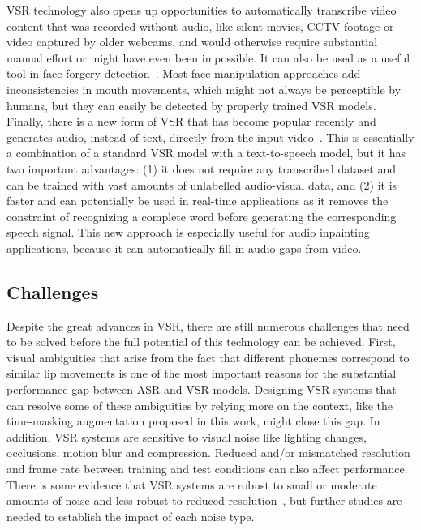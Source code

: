 \documentclass[twocolumn]{article}
\begin{document}
VSR technology also opens up opportunities to automatically transcribe video content that was recorded without audio, like silent movies, CCTV footage or video captured by older webcams, and would otherwise require substantial manual effort or might have even been impossible. It can also be used as a useful tool in face forgery detection~\cite{haliassos2021lips}. Most face-manipulation approaches add inconsistencies in mouth movements, which might not always be perceptible by humans, but they can easily be detected by properly trained VSR models. Finally, there is a new form of VSR that has become popular recently and generates audio, instead of text, directly from the input video~\cite{mira2021end,prajwal2020learning}. This is essentially a combination of a standard VSR model with a text-to-speech model, but it has two important advantages: (1) it does not require any transcribed dataset and can be trained with vast amounts of unlabelled audio-visual data, and (2) it is faster and can potentially be used in real-time applications as it removes the constraint of recognizing a complete word before generating the corresponding speech signal. This new approach is especially useful for audio inpainting applications, because it can automatically fill in audio gaps from video.

\subsection{Challenges}
Despite the great advances in VSR, there are still numerous challenges that need to be solved before the full potential of this technology can be achieved. First, visual ambiguities that arise from the fact that different phonemes correspond to similar lip movements is one of the most important reasons for the substantial performance gap between ASR and VSR models. Designing VSR systems that can resolve some of these ambiguities by relying more on the context, like the time-masking augmentation proposed in this work, might close this gap. In addition, VSR systems are sensitive to visual noise like lighting changes, occlusions, motion blur and compression. Reduced and/or mismatched resolution and frame rate between training and test conditions can also affect performance. There is some evidence that VSR systems are robust to small or moderate amounts of noise and less robust to reduced resolution~\cite{Dungan2018,bear2014resolution}, but further studies are needed to establish the impact of each noise type.
\end{document}
